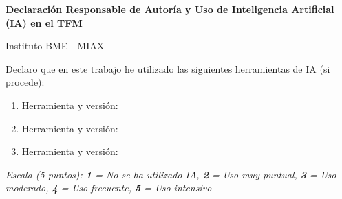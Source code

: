 

\begin{center}
  \vspace*{0.5cm}

  {\Large\textbf{\color{uv-dark}Declaración Responsable de Autoría y Uso de Inteligencia Artificial (IA) en el TFM}}

  \vspace{0.5cm}

  {\LARGE\color{uv-blue}Instituto BME - MIAX}

\end{center}


Declaro que en este trabajo he utilizado las siguientes herramientas de IA (si procede):

\begin{enumerate}
  \item Herramienta y versión: 
  \item Herramienta y versión: 
  \item Herramienta y versión: 
\end{enumerate}

\vspace{0.5cm}



\noindent
\textit{Escala (5 puntos): \textbf{1} = No se ha utilizado IA, \textbf{2} = Uso muy puntual, \textbf{3} = Uso moderado,  \textbf{4} = Uso frecuente, \textbf{5} = Uso intensivo}

